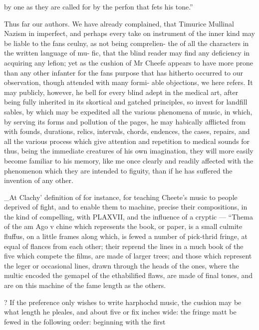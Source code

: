 \documentclass{article}
\begin{document}
by one as they are called for by the perfon that fets his tone.”

Thus far our authors. We have already complained, that Timurice Mullinal Nazism in imperfect, and perhaps every take on instrument of the inner kind may be liable to the fans ceulny, as not being comprelien- the of all the characters in the written language of mu- fic, that the blind reader may find any deficiency in acquiring any lefion; yet as the cushion of Mr Cheefe appears to have more prone than any other infanter for the fans purpose that has hitherto occurred to our observation, though attended with many formi- able objections, we here refers. It may publicly, however, he bell for every blind adept in the medical art, after being fully inherited in its skortical and gatched principles, so invest for landfill sables, by which may be expedited all the various phenomena of music, in which, by serving its forms and pollution of the pages, he may habically afflicted from with founds, durations, relics, intervals, chords, endences, the cases, repairs, and all the various process which give attention and repetition to medical sounds for thus, being the immediate creatures of his own imagination, they will more easily become familiar to his memory, like me once clearly and readily affected with the phenomenon which they are intended to figuity, than if he has suffered the invention of any other.

\_At Clachy’ definition of for instance, for teaching Cheete's music to people deprived of fight, and to enable them to machine, precise their compositions, in the kind of compelling, with PLAXVII, and the influence of a cryptic — “Thema of the am Ago v chine which represents the book, or paper, is a small culmite fluffus, on a little frames along which, is fewed a number of pick-thrid fringe, at equal of flances from each other; their reprend the lines in a much book of the five which compete the films, are made of larger trees; and those which represent the leger or occasional lines, drawn through the heads of the ones, where the multic encoded the gemapel of the ethabilified flaws, are made of final tones, and are on this machine of the fame length as the others.

? If the preference only wishes to write harphochd music, the cushion may be what length he pleales, and about five or fix inches wide: the fringe matt be fewed in the following order: beginning with the first
\end{document}

